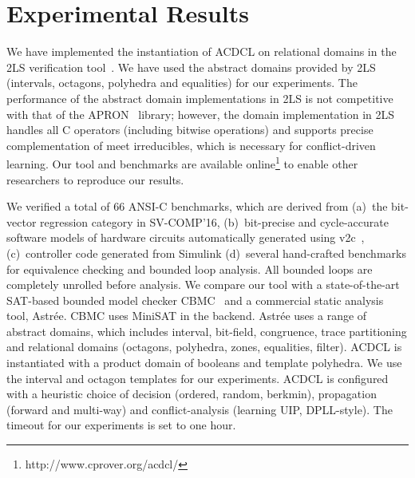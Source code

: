 \section{Experimental Results}

We have implemented the instantiation of ACDCL on relational domains in the
2LS verification tool~\cite{2ls}.  We have used the abstract domains
provided by 2LS (intervals, octagons, polyhedra and equalities) for our
experiments.  The performance of the abstract domain implementations in 2LS
is not competitive with that of the APRON~\cite{apron} library; however, the
domain implementation in 2LS handles all C operators (including bitwise
operations) and supports precise complementation of meet irreducibles, which
is necessary for conflict-driven learning.  Our tool and benchmarks are
available online\footnote{http://www.cprover.org/acdcl/} to enable other
researchers to reproduce our results.

We verified a total of 66 ANSI-C benchmarks, which are derived from (a)~the
bit-vector regression category in SV-COMP'16, (b)~bit-precise and
cycle-accurate software models of hardware circuits automatically generated
using v2c~\cite{mtk2016}, (c)~controller code generated from Simulink
(d)~several hand-crafted benchmarks for equivalence checking and bounded
loop analysis.  All bounded loops are completely unrolled before analysis. 
We compare our tool with a state-of-the-art SAT-based bounded model checker
CBMC~\cite{cbmc} and a commercial static analysis tool, Astr{\'e}e. 
 CBMC uses MiniSAT in the
backend.  Astr{\'e}e uses a range of abstract domains, which includes
interval, bit-field, congruence, trace partitioning and relational domains
(octagons, polyhedra, zones, equalities, filter).  ACDCL is instantiated
with a product domain of booleans and template polyhedra.  We use the
interval and octagon templates for our experiments.  ACDCL is configured
with a heuristic choice of decision (ordered, random, berkmin), propagation
(forward and multi-way) and conflict-analysis (learning UIP, DPLL-style). 
The timeout for our experiments is set to one hour.
%

